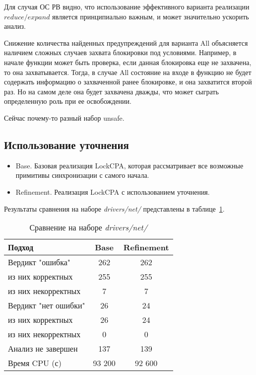 Для случая ОС РВ видно, что использование эффективного варианта реализации $reduce/expand$ является принципиально важным, и может значительно ускорить анализ.

Снижение количества найденных предупреждений для варианта All объясняется наличием сложных случаев захвата блокировки под условиями.
Например, в начале функции может быть проверка, если данная блокировка еще не захвачена, то она захватывается. 
Тогда, в случае All состояние на входе в функцию не будет содержать информацию о захваченной ранее блокировке, и она захватится второй раз.
Но на самом деле она будет захвачена дважды, что может сыграть определенную роль при ее освобождении. 

 Сейчас почему-то разный набор unsafe.

\subsection{Использование уточнения}

\begin{itemize}
\item Base. Базовая реализация LockCPA, которая рассматривает все возможные примитивы синхронизации с самого начала.
\item Refinement. Реализация LockCPA с использованием уточнения.
\end{itemize}

Результаты сравнения на наборе \textit{drivers/net/} представлены в таблице~\ref{table-drivers-lock-refinement}.

  \begin{table}[h]\footnotesize \centering
    \caption{Сравнение на наборе \textit{drivers/net/}}
  	\label{table-drivers-lock-refinement}
    \begin{tabular}{ | l | c | c | }
      \hline 
      Подход         				& Base   	& Refinement \\ \hline
      Вердикт "ошибка" 				& 262    	& 262       \\ 
  \hspace{0.5cm} из них корректных 	& 255 		& 255 		\\ 
  \hspace{0.5cm} из них некорректных & 7 		& 7 		\\ \hline
      Вердикт "нет ошибки"  		& 26      	& 24       	\\ 
  \hspace{0.5cm} из них корректных 	& 26 		& 24    	\\
  \hspace{0.5cm} из них некорректных & 0 		& 0    		\\ \hline
      Анализ не завершен       		& 137     	& 139        \\ \hline
      Время CPU (с)   				& 93 200 	& 92 600    \\ 
      \hline
    \end{tabular}
  \end{table}

